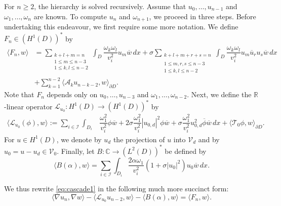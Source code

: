 \documentclass[a4paper,reqno,twoside]{amsart}
\numberwithin{equation}{section}
\theoremstyle{definition}
\newcommand{\<}{\ensuremath \leq}
\renewcommand{\>}{\ensuremath \geq}
\begin{document}
For $n \geq 2$, the hierarchy is solved recursively. Assume that $u_0,\dots, u_{n-1}$ and $\omega_1,\dots,\omega_{n}$ are known. To compute $u_n$ and $\omega_{n+1}$, we proceed in three steps. Before undertaking this endeavour, we first require some more notation. We define $F_{n}\in (H^1(D))^*$ by
\begin{equation}\label{eq:remainder}
    \begin{aligned}
        \langle F_{n}, w\rangle &=\sum_{\substack{k+l+m=n\\1\leq m\leq n-3\\1\leq k,l\leq n-2}}\int_D \dfrac{\omega_k\omega_l}{v_i^2} u_m \overline{w} \, dx 
    + \sigma \sum_{\substack{k+l+m+r+s=n\\\\1\leq m,r,s\leq n-3\\1\leq k,l\leq n -2}}\int_D \dfrac{\omega_k\omega_l}{v_i^2}u_m\overline{u}_r u_s\overline{w} \, dx\\ 
     &+ \sum_{k=1}^{n-2}\langle\mathcal{A}_k u_{n-k-2},w\rangle_{\partial D}.
    \end{aligned}
\end{equation}
Note that $F_n$ depends only on $u_0,\dots,u_{n-3}$ and $\omega_1,\dots,\omega_{n-2}$. Next, we define the $\mathbb{R}$-linear operator $\mathcal{L}_{u_0}:H^1(D)\rightarrow(H^1(D))^*$ by
\begin{equation}
    \begin{aligned}
        \langle \mathcal{L}_{u_0}(\phi), w \rangle := \sum_{i \in \mathcal{I}} \int_{D_i} &\dfrac{\omega_1^2}{v_i^2}\phi\overline{w} + 2\sigma\dfrac{\omega_1^2}{v_i^2}|u_{0,d}|^2\phi\overline{w} 
        + \sigma\dfrac{\omega_1^2}{v_i^2}u_{0,d}^2\overline{\phi}\overline{w} \,dx + \langle\mathcal{T}_0\phi,w\rangle_{\partial D}.
    \end{aligned}
\end{equation}
For $u\in H^1(D)$, we denote by $u_d$ the projection of $u$ into $\mathcal{V}_d$ and by $u_0 = u-u_d\in \mathcal{V}_0$. Finally, let $B:\mathbb{C}\rightarrow(L^2(D))^*$ be defined by
\begin{equation}
    \langle B(\alpha),w\rangle=\sum_{i\in\mathcal{I}}\int_{D_i}\frac{2\alpha\omega_1}{v_i^2}(1+\sigma\lvert u_0\rvert^2)u_0\overline{w}\,dx.
\end{equation}


We thus rewrite \eqref{eq:cascade1} in the following much more succinct form:
\begin{equation}\label{eq:cascade2}
    \langle \nabla u_ n,\nabla w\rangle-\langle \mathcal{L}_{u_0}u_{n-2},w\rangle - \langle B(\alpha),w\rangle = \langle F_{n},w\rangle.
\end{equation}
\end{document}
